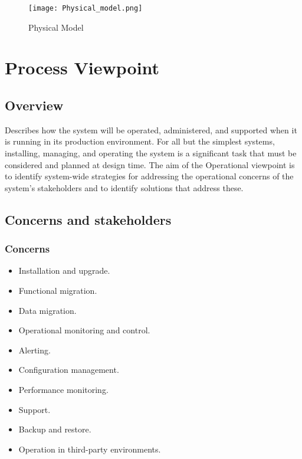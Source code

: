 \FloatBarrier

\begin{figure}[h!]
\centering
\caption{Physical Model}
\texttt{[image: Physical\_model.png]}
\label{Basic Micro-services architecture pattern}
\end{figure}

\FloatBarrier

\section{Process Viewpoint}

\subsection{Overview}

Describes how the system will be operated, administered, and supported when it is running in its production environment. For all but the simplest systems, installing, managing, and operating the system is a significant task that must be considered and planned at design time. The aim of the Operational viewpoint is to identify system-wide strategies for addressing the operational concerns of the system’s stakeholders and to identify solutions that address these.

\subsection{Concerns and stakeholders}

\subsubsection{Concerns}

\begin{itemize}
\item Installation and upgrade.
\item Functional migration. 
\item Data migration.
\item Operational monitoring and control.
\item Alerting.
\item Configuration management.
\item Performance monitoring.
\item Support.
\item Backup and restore.
\item Operation in third-party environments.
\end{itemize}

